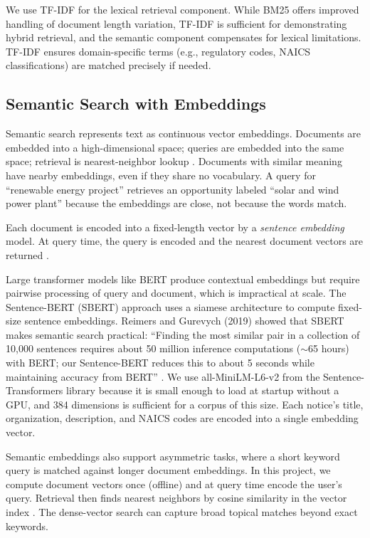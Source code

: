 \documentclass[10pt,twocolumn]{article}
\begin{document}
We use TF-IDF for the lexical retrieval component. While BM25 offers improved handling of document length variation, TF-IDF is sufficient for demonstrating hybrid retrieval, and the semantic component compensates for lexical limitations. TF-IDF ensures domain-specific terms (e.g., regulatory codes, NAICS classifications) are matched precisely if needed.

\subsection{Semantic Search with Embeddings}

Semantic search represents text as continuous vector embeddings. Documents are embedded into a high-dimensional space; queries are embedded into the same space; retrieval is nearest-neighbor lookup \cite{SBERTSemantic}. Documents with similar meaning have nearby embeddings, even if they share no vocabulary. A query for ``renewable energy project'' retrieves an opportunity labeled ``solar and wind power plant'' because the embeddings are close, not because the words match.

Each document is encoded into a fixed-length vector by a \textit{sentence embedding} model. At query time, the query is encoded and the nearest document vectors are returned \cite{SBERTSemantic}.

Large transformer models like BERT produce contextual embeddings but require pairwise processing of query and document, which is impractical at scale. The Sentence-BERT (SBERT) approach \cite{Reimers2019} uses a siamese architecture to compute fixed-size sentence embeddings. Reimers and Gurevych (2019) showed that SBERT makes semantic search practical: ``Finding the most similar pair in a collection of 10,000 sentences requires about 50 million inference computations ($\sim$65 hours) with BERT; our Sentence-BERT reduces this to about 5 seconds while maintaining accuracy from BERT'' \cite{Reimers2019}. We use all-MiniLM-L6-v2 from the Sentence-Transformers library \cite{SBERTHome} because it is small enough to load at startup without a GPU, and 384 dimensions is sufficient for a corpus of this size. Each notice's title, organization, description, and NAICS codes are encoded into a single embedding vector.

Semantic embeddings also support asymmetric tasks, where a short keyword query is matched against longer document embeddings. In this project, we compute document vectors once (offline) and at query time encode the user's query. Retrieval then finds nearest neighbors by cosine similarity in the vector index \cite{SBERTSemantic,ElasticHybrid}. The dense-vector search can capture broad topical matches beyond exact keywords.
\end{document}
